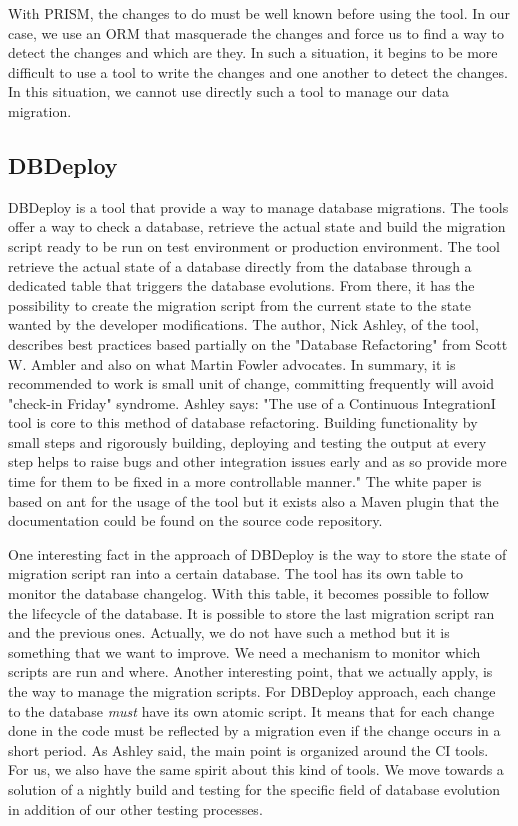 With PRISM, the changes to do must be well known before using the tool. In our case, we use an ORM that masquerade the changes and force us to find a way to detect the changes and which are they. In such a situation, it begins to be more difficult to use a tool to write the changes and one another to detect the changes. In this situation, we cannot use directly such a tool to manage our data migration.

\subsection{DBDeploy}

DBDeploy\cite{ashley_taking_2011} is a tool that provide a way to manage database migrations. The tools offer a way to check a database, retrieve the actual state and build the migration script ready to be run on test environment or production environment. The tool retrieve the actual state of a database directly from the database through a dedicated table that triggers the database evolutions. From there, it has the possibility to create the migration script from the current state to the state wanted by the developer modifications. The author, Nick Ashley, of the tool, describes best practices based partially on the "Database Refactoring" from Scott W. Ambler and also on what Martin Fowler advocates. In summary, it is recommended to work is small unit of change, committing frequently will avoid "check-in Friday" syndrome. Ashley says: "The use of a Continuous IntegrationI\cite{fowler_continuous_integration} tool is core to this method of database refactoring. Building functionality by small steps and rigorously building, deploying and testing the output at every step helps to raise bugs and other integration issues early and as so provide more time for them to be fixed in a more controllable manner." The white paper is based on ant for the usage of the tool but it exists also a Maven\cite{maven} plugin that the documentation could be found on the source code repository\cite{dbdeploy_source}.

One interesting fact in the approach of DBDeploy is the way to store the state of migration script ran into a certain database. The tool has its own table to monitor the database changelog. With this table, it becomes possible to follow the lifecycle of the database. It is possible to store the last migration script ran and the previous ones. Actually, we do not have such a method but it is something that we want to improve. We need a mechanism to monitor which scripts are run and where. Another interesting point, that we actually apply, is the way to manage the migration scripts. For DBDeploy approach, each change to the database \emph{must} have its own atomic script. It means that for each change done in the code must be reflected by a migration even if the change occurs in a short period. As Ashley said, the main point is organized around the CI tools. For us, we also have the same spirit about this kind of tools. We move towards a solution of a nightly build and testing for the specific field of database evolution in addition of our other testing processes.

